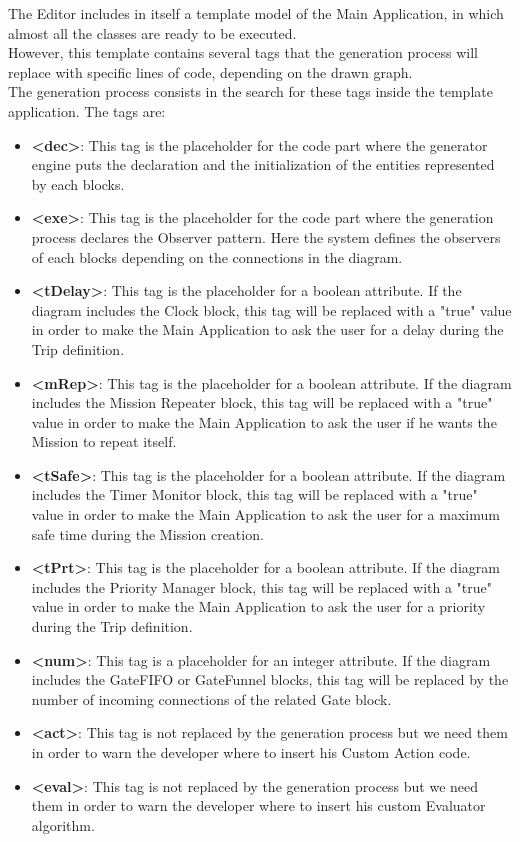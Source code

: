 The Editor includes in itself a template model of the Main Application, in which almost all the classes are ready to be executed.
\\
However, this template contains several tags that the generation process will replace with specific lines of code, depending on the drawn graph.
\\
The generation process consists in the search for these tags inside the template application. The tags are:
\\

\begin{itemize}
\item{\textbf{<dec>}: This tag is the placeholder for the code part where the generator engine puts the declaration and the initialization of the entities represented by each blocks.
}
\item{\textbf{<exe>}: This tag is the placeholder for the code part where the generation process declares the Observer pattern. Here the system defines the observers of each blocks depending on the connections in the diagram. 
}
\item{\textbf{<tDelay>}: This tag is the placeholder for a boolean attribute. If the diagram includes the Clock block, this tag will be replaced with a "true" value in order to make the Main Application to ask the user for a delay during the Trip definition.
}
\item{\textbf{<mRep>}: This tag is the placeholder for a boolean attribute. If the diagram includes the Mission Repeater block, this tag will be replaced with a "true" value in order to make the Main Application to ask the user if he wants the Mission to repeat itself.
}
\item{\textbf{<tSafe>}: This tag is the placeholder for a boolean attribute. If the diagram includes the Timer Monitor block, this tag will be replaced with a "true" value in order to make the Main Application to ask the user for a maximum safe time during the Mission creation.
}
\item{\textbf{<tPrt>}: This tag is the placeholder for a boolean attribute. If the diagram includes the Priority Manager block, this tag will be replaced with a "true" value in order to make the Main Application to ask the user for a priority during the Trip definition.
}
\item{\textbf{<num>}: This tag is a placeholder for an integer attribute. If the diagram includes the GateFIFO or GateFunnel blocks, this tag will be replaced by the number of incoming connections of the related Gate block.
}
\item{\textbf{<act>}: This tag is not replaced by the generation process but we need them in order to warn the developer where to insert his Custom Action code.
}
\item{\textbf{<eval>}: This tag is not replaced by the generation process but we need them in order to warn the developer where to insert his custom Evaluator algorithm. 
}
\end{itemize}

